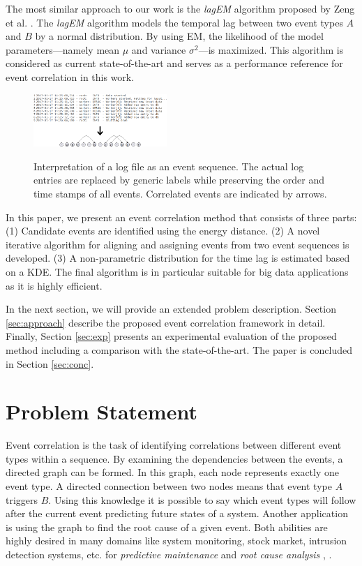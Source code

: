 \documentclass[conference]{IEEEtran}
\theoremstyle{examplestyle}
\begin{document}
The most similar approach to our work is the \textit{lagEM} algorithm proposed by Zeng et al. \cite{Zeng2015}. The \textit{lagEM} algorithm models the temporal lag between two event types \(A\) and \(B\) by a normal distribution. By using \ac{EM}, the likelihood of the model parameters---namely mean \(\mu\) and variance \(\sigma^2\)---is maximized. This algorithm is considered as current state-of-the-art and serves as a performance reference for event correlation in this work.

\begin{figure}[!tb]
	\centering
	{
	\includegraphics[width=0.45\textwidth]{images/overview.png}}
	\caption{Interpretation of a log file as an event sequence. The actual log entries are replaced by generic labels while preserving the order and time stamps of all events. Correlated events are indicated by arrows.}
	\label{fig:logToSequence}
\end{figure}

In this paper, we present an event correlation method that consists of three parts:
(1) Candidate events are identified using the energy distance. (2) A novel iterative algorithm for aligning and assigning events from two event sequences is developed. (3) A non-parametric distribution for the time lag is estimated based on a \ac{KDE}.
The final algorithm is in particular suitable for big data applications as it is highly efficient. 

In the next section, we will provide an extended problem description.
Section \ref{sec:approach} describe the proposed event correlation framework in detail.
Finally, Section \ref{sec:exp} presents an experimental evaluation of the proposed method including a comparison with the state-of-the-art.
The paper is concluded in Section \ref{sec:conc}.


\section{Problem Statement}
Event correlation is the task of identifying correlations between different event types within a sequence. By examining the dependencies between the events, a directed graph can be formed. In this graph, each node represents exactly one event type. A directed connection between two nodes means that event type \(A\) triggers \(B\). Using this knowledge it is possible to say which event types will follow after the current event predicting future states of a system. Another application is using the graph to find the root cause of a given event. Both abilities are highly desired in many domains like system monitoring, stock market, intrusion detection systems, etc. for \textit{predictive maintenance} and \textit{root cause analysis} \cite{Zeng2015}, \cite{Benferhat2008}.
\end{document}
